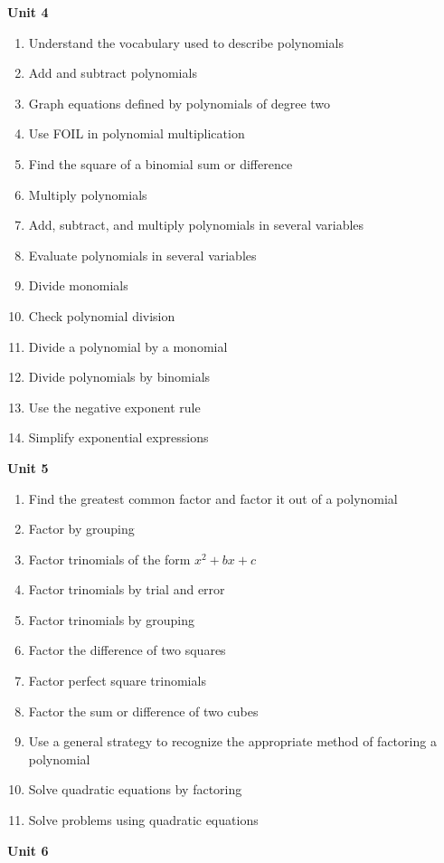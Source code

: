 \documentclass[10pt]{article}
\newenvironment{alphalist}{
\begin{enumerate}[label=(\arabic*),widest=107 ,leftmargin=25pt, itemsep=0pt]}
{\end{enumerate}}
\begin{document}
\noindent \textbf{Unit 4}
 \begin{alphalist}
    \item Understand the vocabulary used to describe polynomials
    \item Add and subtract polynomials
    \item Graph equations defined by polynomials of degree two
    \item Use FOIL in polynomial multiplication
    \item Find the square of a binomial sum or difference
    \item Multiply polynomials
    \item Add, subtract, and multiply polynomials in several variables
    \item Evaluate polynomials in several variables
    \item Divide monomials
    \item Check polynomial division
    \item Divide a polynomial by a monomial 
    \item Divide polynomials by binomials
    \item Use the negative exponent rule
    \item Simplify exponential expressions
 \end{alphalist}
\noindent \textbf{Unit 5}
 \begin{alphalist}
    \item Find the greatest common factor and factor it out of a polynomial
    \item Factor by grouping
    \item Factor trinomials of the form $x^2 + bx + c$
    \item Factor trinomials by trial and error
    \item Factor trinomials by grouping
    \item Factor the difference of two squares
    \item Factor perfect square trinomials
    \item Factor the sum or difference of two cubes
    \item Use a general strategy to recognize the appropriate method of factoring a polynomial
    \item Solve quadratic equations by factoring
    \item Solve problems using quadratic equations
 \end{alphalist}
\noindent \textbf{Unit 6}
\end{document}
